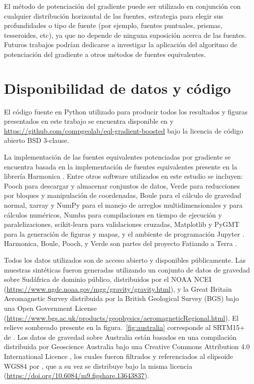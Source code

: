 El método de potenciación del gradiente puede ser utilizado en conjunción con
cualquier distribución horizontal de las fuentes, estrategia para elegir sus
profundidades o tipo de fuente (por ejemplo, fuentes puntuales, prismas,
tesseroides, etc), ya que no depende de ninguna suposición acerca de las
fuentes.
Futuros trabajos podrían dedicarse a investigar la aplicación del algoritmo de
potenciación del gradiente a otros métodos de fuentes equivalentes.


\section{Disponibilidad de datos y código}

El código fuente en Python utilizado para producir todos los resultados
y figuras presentados en este trabajo se encuentra disponible en
\citet{soler2021b} y \url{https://github.com/compgeolab/eql-gradient-boosted}
bajo la licencia de código abierto BSD 3-clause.

La implementación de las fuentes equivalentes potenciadas por gradiente se
encuentra basada en la implementación de fuentes equivalentes presente en la
librería Harmonica \citep{harmonica2021}.
Entre otros software utilizados en este estudio se incluyen:
Pooch \citep{pooch2020} para descargar y almacenar conjuntos de datos,
Verde \citep{verde2018} para reducciones por bloques y manipulación de
coordenadas,
Boule \citep{boule2020} para el cálculo de gravedad normal,
xarray \citep{xarray2017} y NumPy \citep{numpy2020}
para el manejo de arreglos multidimensionales y para cálculos numéricos,
Numba \citep{numba2015} para compilaciones en tiempo de ejecución
y paralelizaciones,
scikit-learn \citep{sklearn2011} para validaciones cruzadas,
Matplotlib \citep{matplotlib2007} y PyGMT \citep{pygmt2020}
para la generación de figuras y mapas,
y el ambiente de programación Jupyter \citep{jupyter2016}.
Harmonica, Boule, Pooch, y Verde son partes del proyecto Fatiando a Terra
\citep{uieda2013}.

Todos los datos utilizados son de acceso abierto y disponibles públicamente.
Las muestras sintéticas fueron generadas utilizando un conjunto de datos de
gravedad sobre Sudáfrica de dominio público, distribuidos por el
NOAA NCEI (\url{https://www.ngdc.noaa.gov/mgg/gravity/gravity.html}),
y la Great Britain Aeromagnetic Survey distribuida por la
British Geological Survey (BGS) bajo una Open Government License
(\url{https://www.bgs.ac.uk/products/geophysics/aeromagneticRegional.html}).
El relieve sombreado presente en la figura.~\ref{fig:australia} corresponde al
SRTM15+ de \citet{tozer2019}.
Los datos de gravedad sobre Australia están basados en una compilación
distribuida por Geoscience Australia bajo una Creative Commons Attribution 4.0
International Licence \citep{wynne2018}, los cuales fueron filtrados
y referenciados al elipsoide WGS84 por \citet{australia_compilation}, que a su
vez se distribuye bajo la misma licencia
(\url{https://doi.org/10.6084/m9.figshare.13643837}).


